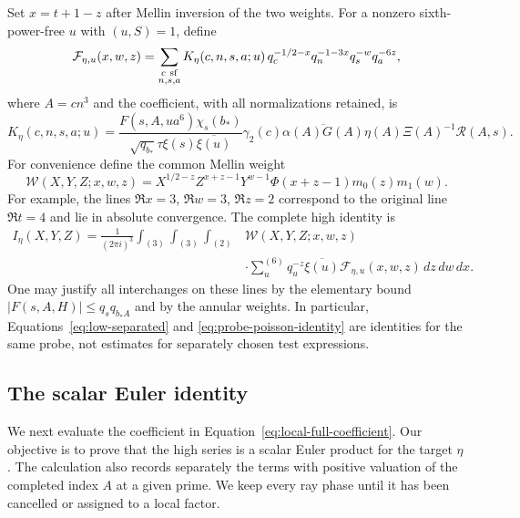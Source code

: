 \documentclass[12pt]{article}
\begin{document}
Set $x=t+1-z$ after Mellin inversion of the two weights.  For a
nonzero sixth-power-free $u$ with $(u,S)=1$, define
\begin{equation}\label{eq:local-full-series}
 \mathcal F_{\eta,u}(x,w,z)=
 \sum_{\substack{c\ {\rm sf}\\n,s,a}}
 K_\eta(c,n,s,a;u)\,
 q_c^{-1/2-x}q_n^{-1-3x}q_s^{-w}q_a^{-6z},
\end{equation}
where $A=cn^3$ and the coefficient, with all normalizations retained,
is
\begin{equation}\label{eq:local-full-coefficient}
 K_\eta(c,n,s,a;u)=
 \frac{F(s,A,ua^6)\chi_s(b_*)}
 {\sqrt{q_{b_*}}\tau\xi(s)\overline{\xi(u)}}
 \gamma_2(c)\overline{\alpha(A)G(A)}
 \eta(A)\Xi(A)^{-1}\mathcal R(A,s).
\end{equation}
For convenience define the common Mellin weight
\[
 \mathcal W(X,Y,Z;x,w,z)=
 X^{1/2-z}Z^{x+z-1}Y^{w-1}
 \Phi(x+z-1)m_0(z)m_1(w).
\]
For example, the lines $\Re x=3$, $\Re w=3$, $\Re z=2$ correspond
to the original line $\Re t=4$ and lie in absolute convergence.
The complete high identity is
\begin{equation}\label{eq:probe-poisson-identity}
 \begin{split}
 I_\eta(X,Y,Z)=\frac1{(2\pi i)^3}
 \int_{(3)}\int_{(3)}\int_{(2)}
 &\mathcal W(X,Y,Z;x,w,z)\\
 &\cdot\sum_u^{(6)}q_u^{-z}\overline{\xi(u)}
             \mathcal F_{\eta,u}(x,w,z)\,dz\,dw\,dx.
 \end{split}
\end{equation}
One may justify all interchanges on these lines by the elementary
bound $|F(s,A,H)|\le q_sq_{b_*A}$ and by the annular weights.
In particular, Equations~\eqref{eq:low-separated} and
\eqref{eq:probe-poisson-identity} are identities for the same
probe, not estimates for separately chosen test expressions.

\subsection{The scalar Euler identity}
\label{sec:local-euler}

We next evaluate the coefficient in
Equation~\eqref{eq:local-full-coefficient}.  Our objective is to prove
that the high series is a scalar Euler product for the target $\eta$.
The calculation also records separately the terms with positive valuation
of the completed index $A$ at a given prime.  We keep every ray phase until
it has been cancelled or assigned to a local factor.
\end{document}
